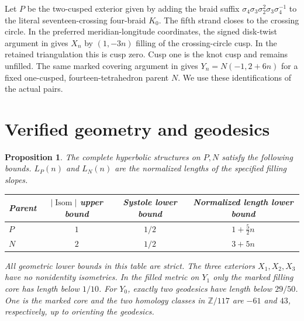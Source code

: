 \documentclass[11pt]{article}
\newtheorem{proposition}[theorem]{Proposition}
\newcommand{\Isom}{\operatorname{Isom}}
\begin{document}
Let $P$ be the two-cusped exterior given by adding the braid suffix
$\sigma_4\sigma_3\sigma_2^2\sigma_3\sigma_4^{-1}$ to the literal
seventeen-crossing four-braid $K_0$. The fifth strand closes to the
crossing circle. In the preferred meridian-longitude coordinates,
the signed disk-twist argument in \cite{covers} gives $X_n$ by
$(1,-3n)$ filling of the crossing-circle cusp. In the retained
triangulation this is cusp zero. Cusp one is the knot cusp and
remains unfilled. The same marked covering argument in \cite{covers}
gives $Y_n=N(-1,2+6n)$ for a fixed one-cusped, fourteen-tetrahedron
parent $N$. We use these identifications of the actual pairs.

\section{Verified geometry and geodesics}\label{sec:geometry}
\begin{proposition}\label{prop:geocert}
The complete hyperbolic structures on $P,N$ satisfy the following
bounds. $L_P(n)$ and $L_N(n)$ are the normalized lengths of the
specified filling slopes.
\begin{center}
\begin{tabular}{lccc}
\toprule
Parent & $|\Isom|$ upper bound & Systole lower bound & Normalized length lower bound\\
\midrule
$P$ & $1$ & $1/2$ & $1+\frac52 n$\\[2pt]
$N$ & $2$ & $1/2$ & $3+5n$\\
\bottomrule
\end{tabular}
\end{center}
All geometric lower bounds in this table are strict. The three
exteriors $X_1,X_2,X_3$ have no nonidentity isometries. In the filled
metric on $Y_1$ only the marked filling core has length below $1/10$.
For $Y_0$, exactly two geodesics have length below $29/50$. One is
the marked core and the two homology classes in $\mathbb Z/117$ are
$-61$ and $43$, respectively, up to orienting the geodesics.
\end{proposition}
\end{document}
